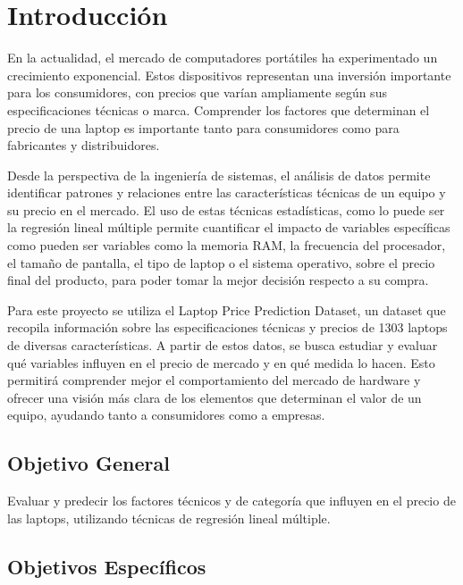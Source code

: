 \documentclass[12pt,a4paper]{article}
\begin{document}
\newpage
\tableofcontents
\newpage


\section{Introducción}

En la actualidad, el mercado de computadores portátiles ha experimentado un crecimiento exponencial. Estos dispositivos representan una inversión importante para los consumidores, con precios que varían ampliamente según sus especificaciones técnicas o marca. Comprender los factores que determinan el precio de una laptop es importante tanto para consumidores como para fabricantes y distribuidores.

Desde la perspectiva de la ingeniería de sistemas, el análisis de datos permite identificar patrones y relaciones entre las características técnicas de un equipo y su precio en el mercado. El uso de estas técnicas estadísticas, como lo puede ser la regresión lineal múltiple permite cuantificar el impacto de variables específicas como pueden ser variables como la memoria RAM, la frecuencia del procesador, el tamaño de pantalla, el tipo de laptop o el sistema operativo, sobre el precio final del producto, para poder tomar la mejor decisión respecto a su compra.

Para este proyecto se utiliza el Laptop Price Prediction Dataset, un dataset que recopila información sobre las especificaciones técnicas y precios de 1303 laptops de diversas características. A partir de estos datos, se busca estudiar y evaluar qué variables influyen en el precio de mercado y en qué medida lo hacen. Esto permitirá comprender mejor el comportamiento del mercado de hardware y ofrecer una visión más clara de los elementos que determinan el valor de un equipo, ayudando tanto a consumidores como a empresas.

\subsection{Objetivo General}

Evaluar y predecir los factores técnicos y de categoría que influyen en el precio de las laptops, utilizando técnicas de regresión lineal múltiple.

\subsection{Objetivos Específicos}
\end{document}
